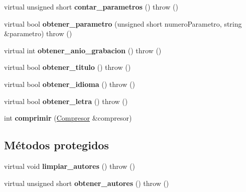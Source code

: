 \begin{DoxyCompactItemize}
\item 
\hypertarget{class_registro_cancion_acc1b761e5102e7574f4c300614d5ab65}{virtual unsigned short {\bfseries contar\-\_\-parametros} ()  throw ()}\label{class_registro_cancion_acc1b761e5102e7574f4c300614d5ab65}

\item 
\hypertarget{class_registro_cancion_ad85d265efefecd3ecdd68751344ced9a}{virtual bool {\bfseries obtener\-\_\-parametro} (unsigned short numero\-Parametro, string \&parametro)  throw ()}\label{class_registro_cancion_ad85d265efefecd3ecdd68751344ced9a}

\item 
\hypertarget{class_registro_cancion_a860eb763f49006ba4331b9bb8fe115ff}{virtual int {\bfseries obtener\-\_\-anio\-\_\-grabacion} ()  throw ()}\label{class_registro_cancion_a860eb763f49006ba4331b9bb8fe115ff}

\item 
\hypertarget{class_registro_cancion_abe0fcc1c1b5287650b56c4643d5a50c6}{virtual bool {\bfseries obtener\-\_\-titulo} ()  throw ()}\label{class_registro_cancion_abe0fcc1c1b5287650b56c4643d5a50c6}

\item 
\hypertarget{class_registro_cancion_abe5f4617eb7c2d92770fafd2b76479ee}{virtual bool {\bfseries obtener\-\_\-idioma} ()  throw ()}\label{class_registro_cancion_abe5f4617eb7c2d92770fafd2b76479ee}

\item 
\hypertarget{class_registro_cancion_a47fc87b97cce6239121a51544919948e}{virtual bool {\bfseries obtener\-\_\-letra} ()  throw ()}\label{class_registro_cancion_a47fc87b97cce6239121a51544919948e}

\item 
\hypertarget{class_registro_cancion_a26f5eaad760b4d8ebe3624adb787f737}{int {\bfseries comprimir} (\hyperlink{class_compresor}{\-Compresor} \&compresor)}\label{class_registro_cancion_a26f5eaad760b4d8ebe3624adb787f737}

\end{DoxyCompactItemize}
\subsection*{\-Métodos protegidos}
\begin{DoxyCompactItemize}
\item 
\hypertarget{class_registro_cancion_a1eeaab80c52b4d05d38b8db249a1529e}{virtual void {\bfseries limpiar\-\_\-autores} ()  throw ()}\label{class_registro_cancion_a1eeaab80c52b4d05d38b8db249a1529e}

\item 
\hypertarget{class_registro_cancion_a4944b09ac278ae6187ad4ec99db6a3ae}{virtual unsigned short {\bfseries obtener\-\_\-autores} ()  throw ()}\label{class_registro_cancion_a4944b09ac278ae6187ad4ec99db6a3ae}

\end{DoxyCompactItemize}
